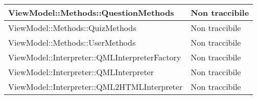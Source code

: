 \begin{longtable}{p{}p{}}

\midrule
ViewModel::Methods::QuestionMethods	& Non traccibile\\
\midrule
ViewModel::Methods::QuizMethods	& Non traccibile\\
\midrule
ViewModel::Methods::UserMethods	& Non traccibile\\


\midrule
ViewModel::Interpreter::QMLInterpreterFactory	& Non traccibile\\
\midrule
ViewModel::Interpreter::QMLInterpreter	& Non traccibile\\
\midrule
ViewModel::Interpreter::QML2HTMLInterpreter	& Non traccibile\\
\midrule
							
	\end{longtable}			
	\newpage